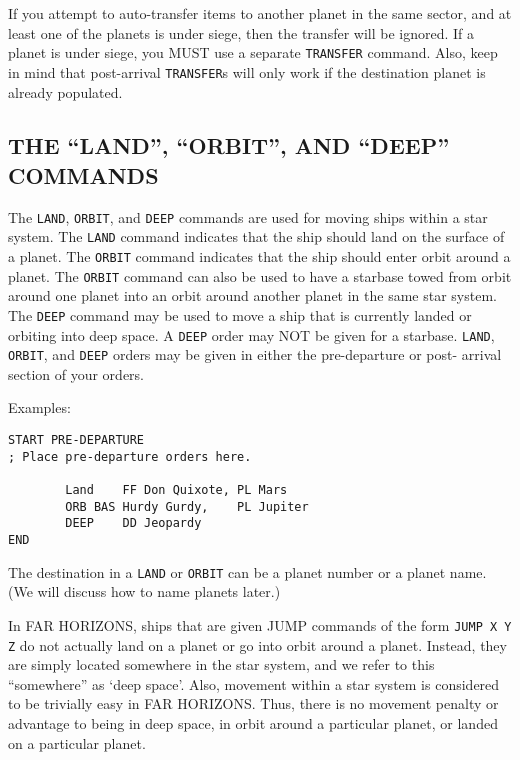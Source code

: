 \documentclass[10pt,titlepage]{article}
\begin{document}
\begin{importantnote}
	If you attempt to auto-transfer items to another planet in the
	same sector, and at least one of the planets is under siege, then
	the transfer will be ignored.  If a planet is under siege, you
	MUST use a separate \texttt{TRANSFER} command.  Also, keep in mind that
	post-arrival \texttt{TRANSFER}s will only work if the destination planet
	is already populated.
\end{importantnote}

\subsection{THE ``LAND'', ``ORBIT'', AND ``DEEP'' COMMANDS}
\label{sec:landorbitdeep}

The \texttt{LAND}, \texttt{ORBIT}, and \texttt{DEEP} commands are used for moving ships within a star
system.  The \texttt{LAND} command indicates that the ship should land on the surface of
a planet.  The \texttt{ORBIT} command indicates that the ship should enter orbit around
a planet.  The \texttt{ORBIT} command can also be used to have a starbase towed from
orbit around one planet into an orbit around another planet in the same star
system.  The \texttt{DEEP} command may be used to move a ship that is currently landed
or orbiting into deep space.  A \texttt{DEEP} order may NOT be given for a starbase.
\texttt{LAND}, \texttt{ORBIT}, and \texttt{DEEP} orders may be given in either the pre-departure or post-
arrival section of your orders.

\noindent Examples:
\begin{verbatim}
START PRE-DEPARTURE
; Place pre-departure orders here.

        Land    FF Don Quixote, PL Mars 
        ORB BAS Hurdy Gurdy,    PL Jupiter
        DEEP    DD Jeopardy
END
\end{verbatim} 

The destination in a \texttt{LAND} or \texttt{ORBIT} can be a planet number or a planet name.
(We will discuss how to name planets later.)

In FAR HORIZONS, ships that are given JUMP commands of the form \texttt{JUMP X Y Z}
do not actually land on a planet or go into orbit around a planet.  Instead,
they are simply located somewhere in the star system, and we refer to this
``somewhere'' as `deep space'.  Also, movement within a star system is considered
to be trivially easy in FAR HORIZONS.  Thus, there is no movement penalty or
advantage to being in deep space, in orbit around a particular planet, or
landed on a particular planet.
\end{document}
